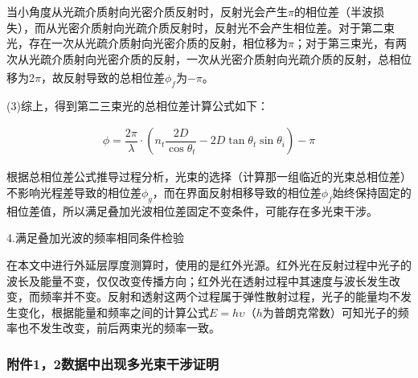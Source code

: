 \documentclass[UTF8]{ctexart}
\begin{document}
当小角度从光疏介质射向光密介质反射时，反射光会产生$\pi$的相位差（半波损失），而从光密介质射向光疏介质反射时，反射光不会产生相位差。对于第二束光，存在一次从光疏介质射向光密介质的反射，相位移为$\pi$；对于第三束光，有两次从光疏介质射向光密介质的反射，一次从光密介质射向光疏介质的反射，总相位移为2$\pi$，故反射导致的总相位差$\phi_f$为$-\pi$\textsuperscript{\cite{6}}。\par 
(3)综上，得到第二三束光的总相位差计算公式如下：\par 
\begin{align}
	\phi=\dfrac{2\pi}{\lambda}\cdot(n_t\dfrac{2D}{\cos\theta_t}-2D\tan\theta_t\sin\theta_i)-\pi
\end{align}\par 
根据总相位差公式推导过程分析，光束的选择（计算那一组临近的光束总相位差）不影响光程差导致的相位差$\phi_g$，而在界面反射相移导致的相位差$\phi_f$始终保持固定的相位差值，所以满足叠加光波相位差固定不变条件，可能存在多光束干涉。\par 
4.满足叠加光波的频率相同条件检验\par 
在本文中进行外延层厚度测算时，使用的是红外光源。红外光在反射过程中光子的波长及能量不变，仅仅改变传播方向；红外光在透射过程中其速度与波长发生改变，而频率并不变。反射和透射这两个过程属于弹性散射过程，光子的能量均不发生变化，根据能量和频率之间的计算公式$E=h\upsilon$（$h$为普朗克常数）可知光子的频率也不发生改变，前后两束光的频率一致。\par 
\subsubsection{附件1，2数据中出现多光束干涉证明}
\end{document}
